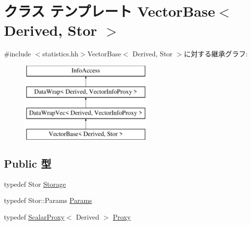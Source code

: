 \hypertarget{classStats_1_1VectorBase}{
\section{クラス テンプレート VectorBase$<$ Derived, Stor $>$}
\label{classStats_1_1VectorBase}
}


{\ttfamily \#include $<$statistics.hh$>$}VectorBase$<$ Derived, Stor $>$に対する継承グラフ:\begin{figure}[H]
\begin{center}
\leavevmode
\includegraphics[height=4cm]{classStats_1_1VectorBase}
\end{center}
\end{figure}
\subsection*{Public 型}
\begin{DoxyCompactItemize}
\item 
typedef Stor \hyperlink{classStats_1_1VectorBase_a5d4a6db0e7c32292f54a08d05c671bd1}{Storage}
\item 
typedef Stor::Params \hyperlink{classStats_1_1VectorBase_a24c5f88dc162c95e0b32ade67a7ea674}{Params}
\item 
typedef \hyperlink{classStats_1_1ScalarProxy}{ScalarProxy}$<$ Derived $>$ \hyperlink{classStats_1_1VectorBase_ac21218152a73febec4e5dfcc36b04ca5}{Proxy}
\end{DoxyCompactItemize}
